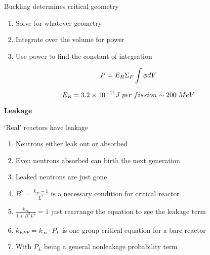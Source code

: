 \documentclass[aspectratio=1610,pdftex,dvipsnames,compress,xcolor={dvipsnames}]{beamer}
\begin{document}
\begin{frame}{Buckling determines critical geometry}
    \begin{enumerate}[series=outerlist,topsep=0pt,itemsep=21pt,leftmargin=*,label=(\arabic*)]
        \item[]Solve for whatever geometry
        \item[]Integrate over the volume for power
        \item[]Use power to find the constant of integration
    \end{enumerate}

    \vspace*{\fill}

    \begin{equation}
        \LARGE
        P = E_R \Sigma_F \int \phi dV
    \end{equation}

    \begin{equation}
        \LARGE
        E_R = 3.2 \times 10^{-11} J \; per \; fission \sim 200 \; MeV
    \end{equation}
\end{frame}


\begin{frame}[plain]{}
    \centering\LARGE\textbf{Leakage}
\end{frame}


\addtocounter{framenumber}{-1} 
\begin{frame}{`Real' reactors have leakage }
    \begin{enumerate}[series=outerlist,topsep=0pt,itemsep=21pt,leftmargin=*,label=(\arabic*)]
        \item[]Neutrons either leak out or absorbed
        \item[]Even neutrons absorbed can birth the next generation
        \item[]Leaked neutrons are just gone
        \item[]$B^2 = \frac{k_\infty - 1}{L^2}$ is a necessary condition for critical reactor
        \item[]$\frac{k_\infty}{1+B^2L^2}=1$ just rearrange the equation to see the leakage term
        \item[]$k_{EFF} = k_{\infty} \cdot P_L$ is one group critical equation for a bare reactor
        \item[]With $P_L$ being a general nonleakage probability term
    \end{enumerate}
\end{frame}
\end{document}
